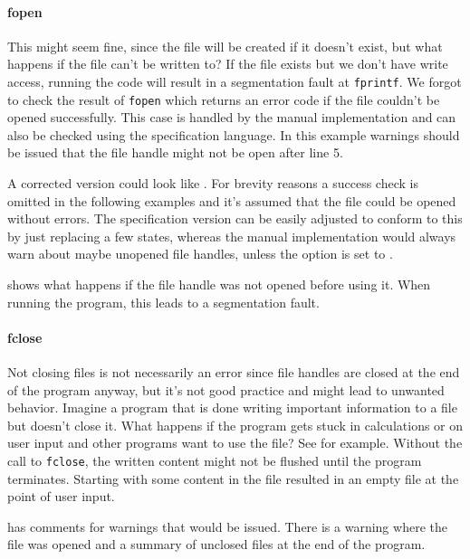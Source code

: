 \paragraph*{fopen}
This might seem fine, since the file will be created if it doesn't exist, but what happens if the file can't be written to?
If the file exists but we don't have write access, running the code will result in a segmentation fault at \verb|fprintf|.
We forgot to check the result of \verb|fopen| which returns an error code if the file couldn't be opened successfully.
This case is handled by the manual implementation and can also be checked using the specification language. In this example warnings should be issued that the file handle might not be open after line 5.

A corrected version could look like .
For brevity reasons a success check is omitted in the following examples and it's assumed that the file could be opened without errors. The specification version can be easily adjusted to conform to this by just replacing a few states, whereas the manual implementation would always warn about maybe unopened file handles, unless the option  is set to .

 shows what happens if the file handle was not opened before using it. When running the program, this leads to a segmentation fault.

\paragraph*{fclose}
Not closing files is not necessarily an error since file handles are closed at the end of the program anyway, but it's not good practice and might lead to unwanted behavior.
Imagine a program that is done writing important information to a file but doesn't close it. What happens if the program gets stuck in calculations or on user input and other programs want to use the file? See  for example. Without the call to \verb|fclose|, the written content might not be flushed until the program terminates. Starting with some content in the file resulted in an empty file at the point of user input.

 has comments for warnings that would be issued. There is a warning where the file was opened and a summary of unclosed files at the end of the program.

